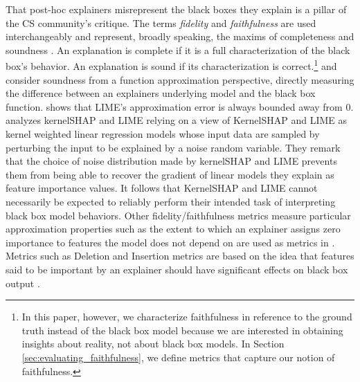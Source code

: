 \documentclass[mnsc,blindrev]{informs3}
\begin{document}
    
    That post-hoc explainers misrepresent  the black boxes they explain is a pillar of the CS community's critique. The terms \emph{fidelity} and \emph{faithfulness} are used interchangeably and represent, broadly speaking, the maxims of completeness and soundness \citep{zhou21evaluating}. An explanation is complete if it is a full characterization of the black box's behavior. An explanation is sound if its characterization is correct.\footnote{In this paper, however, we characterize faithfulness in reference to the ground truth instead of the black box model because we are interested in obtaining insights about reality, not about black box models. In Section \ref{sec:evaluating_faithfulness}, we define metrics that capture our notion of faithfulness.} 
    \cite{garreau2020looking} and \cite{han22which} consider soundness from a function approximation perspective, directly measuring the difference between an explainers underlying model and the black box function. \cite{garreau2020looking} shows that LIME's approximation error is always bounded away from 0. \cite{han22which} analyzes kernelSHAP and LIME relying on a view of KernelSHAP and LIME as kernel weighted linear regression models whose input data are sampled by perturbing the input to be explained by a noise random variable. They remark that the choice of noise distribution made by kernelSHAP and LIME prevents them from being able to recover the gradient of linear models they explain as feature importance values. It follows that KernelSHAP and LIME cannot necessarily be expected to reliably perform their intended task of interpreting black box model behaviors. 
Other fidelity/faithfulness metrics measure particular approximation properties such as the extent to which an explainer assigns zero importance to features the model does not depend on are used as metrics in \cite{nguyen2020quantitative}. Metrics such as Deletion and Insertion metrics are based on the idea that features said to be important by an explainer should have significant effects on black box output \citep{deyoung20eraser,nguyen2020quantitative,alvarez18robustness,luss2021leveraging}.
    
\end{document}
